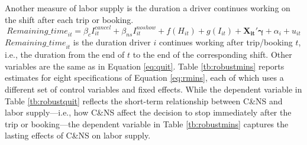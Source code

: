 \documentclass[reviewmode]{restat}
\begin{document}
\begin{appendices}
Another measure of labor supply is the duration a driver continues working on the shift after each trip or booking. 
\begin{equation}
\label{eq:rmins}
{Remaining\_time}_{it} = \beta_c I^{cancel}_{it} + \beta_{ns} I^{noshow}_{it} + f(H_{it}) + g(I_{it}) + \mathbf{X_{it}}'\mathbf{\gamma} + \alpha_i + u_{it}
\end{equation}
${Remaining\_time}_{it}$ is the duration driver $i$ continues working after trip/booking $t$, i.e., the 
duration from the end of $t$ %
to the end of the corresponding shift. %
Other variables are %
the same as in Equation \eqref{eq:quit}.
Table \ref{tb:robustmins} reports estimates for eight specifications of Equation \eqref{eq:rmins},
each of which uses a different set of control variables and fixed effects. While the dependent variable
in Table \ref{tb:robustquit} reflects the short-term relationship between C\&NS and labor supply---i.e., 
how C\&NS affect the decision to stop immediately after the trip or booking---the dependent variable
in Table \ref{tb:robustmins} captures the lasting effects of C\&NS on labor supply. %

\end{appendices}
\end{document}
